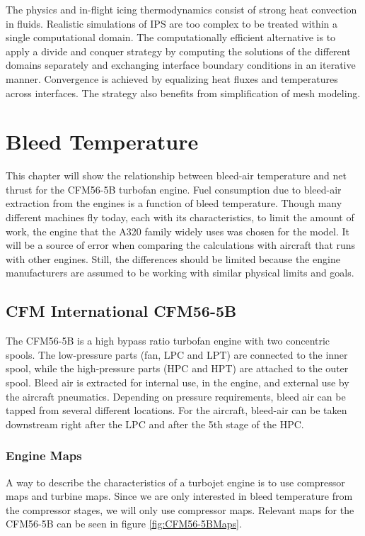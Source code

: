 \documentclass[english]{kththesis}
\begin{document}
The physics and in-flight icing thermodynamics consist of strong heat convection in fluids. Realistic simulations of IPS are too complex to be treated within a single computational domain. The computationally efficient alternative is to apply a divide and conquer strategy by computing the solutions of the different domains separately and exchanging interface boundary conditions in an iterative manner. Convergence is achieved by equalizing heat fluxes and temperatures across interfaces. The strategy also benefits from simplification of mesh modeling.
\cleardoublepage
\chapter{Bleed Temperature}
\label{ch:bleedtemp}
This chapter will show the relationship between bleed-air temperature and net thrust for the CFM56-5B turbofan engine. Fuel consumption due to bleed-air extraction from the engines is a function of bleed temperature. Though many different machines fly today, each with its characteristics, to limit the amount of work, the engine that the A320 family widely uses was chosen for the model. It will be a source of error when comparing the calculations with aircraft that runs with other engines. Still, the differences should be limited because the engine manufacturers are assumed to be working with similar physical limits and goals.

\section{CFM International CFM56-5B}
\label{sec:cfm56-5b}
The CFM56-5B is a high bypass ratio turbofan engine with two concentric spools. The low-pressure parts (fan, LPC and LPT) are connected to the inner spool, while the high-pressure parts (HPC and HPT) are attached to the outer spool. Bleed air is extracted for internal use, in the engine, and external use by the aircraft pneumatics. Depending on pressure requirements, bleed air can be tapped from several different locations. For the aircraft, bleed-air can be taken downstream right after the LPC and after the 5th stage of the HPC.

\subsection{Engine Maps}
\label{subsec:enginemaps}
A way to describe the characteristics of a turbojet engine is to use compressor maps and turbine maps. Since we are only interested in bleed temperature from the compressor stages, we will only use compressor maps. Relevant maps for the CFM56-5B can be seen in figure \ref{fig:CFM56-5BMaps}.
\end{document}
